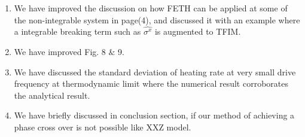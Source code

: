 \documentclass[aps,prb,reprint,showpacs,floatfix,superscriptaddress, onecolumn, nofootinbib, 9pt]{revtex4-2}
\begin{document}
	
	\begin{enumerate}
		\item We have improved the discussion on how FETH can be applied at some of the non-integrable system in page(4), and discussed it with an example where a integrable breaking term such as $\hat{\sigma^x}$ is augmented to TFIM.
		\item We have improved Fig. 8 $\&$ 9.
		\item We have discussed the standard deviation of heating rate at very small drive frequency at thermodynamic limit where the numerical result corroborates the analytical result.
		\item We have briefly discussed in conclusion section, if our method of achieving a phase cross over is not possible like XXZ model. 
	\end{enumerate}
	
	
	
	
\end{document}
